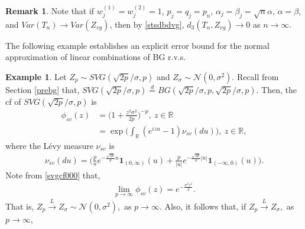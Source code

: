 \documentclass[12pt, a4paper,reqno]{amsart}
\theoremstyle{definition}
\newtheorem{exmp}[thm]{Example}
\theoremstyle{myremark}
\newtheorem{rem}[thm]{Remark}
\numberwithin{equation}{section}
\begin{document}
\begin{rem}
Note that if $w_j^{(1)}=w_j^{(2)}=1$, $p_j=q_j=p_n$, $\alpha_j=\beta_j=\sqrt{n} \alpha$, $\alpha=\beta$, and $Var(T_n) \to Var (Z_{vg})$, then by \eqref{stsdbdvg}, $d_3(T_n,Z_{vg}) \to 0$ as $n \to \infty$. 
\end{rem}
\vspace{-0.5cm}
\noindent
The following example establishes an explicit error bound for the normal approximation of linear combinations of BG r.v.s.
\vspace{-0.6cm}
\begin{exmp}
	Let $Z_p\sim SVG(\sqrt{2p}/\sigma, p)$ and $Z_\sigma \sim \mathcal{N}(0,\sigma^2) $. Recall from Section \ref{prebg} that,
$SVG(\sqrt{2p}/\sigma, p) \overset{d}{=}BG(\sqrt{2p}/\sigma, p,\sqrt{2p}/\sigma, p)$. Then, the cf of $SVG(\sqrt{2p}/\sigma, p)$ is
\begin{align}
\label{svgcf000}	\phi_{sv}(z)&= \bigg(1+ \frac{z^2 \sigma^2}{2p} \bigg)^{-p},~z\in\mathbb{R}\\
&=\exp\bigg(\displaystyle\int_{\mathbb{R}} (e^{izu}-1)\nu_{sv}(du)  \bigg),~z\in\mathbb{{R}},
\end{align}  
\noindent
where the L\'evy measure $\nu_{sv}$ is 
\begin{align*}
\nu_{sv}(du)=\bigg(\frac{p}{u}e^{- \frac{\sqrt{2p}}{\sigma} u}\textbf{1}_{(0,\infty)}(u)+ \frac{p}{|u|}e^{- \frac{\sqrt{2p}}{\sigma} |u|}\textbf{1}_{(-\infty,0)}(u) \bigg).
\end{align*}
\noindent
Note from \eqref{svgcf000} that, 
\begin{align*}
\lim_{p\to\infty}\phi_{sv}(z)=e^{-\frac{\sigma^2 z^2}{2}}.
\end{align*}
\noindent
That is, $Z_p \overset{L}{\to} Z_\sigma \sim \mathcal{N}(0,\sigma^2),$ as $p\to\infty.$ Also, it follows \cite[Theorem 7.12]{Villani} that, if $Z_p \overset{L}{\to} Z_\sigma,$ as $p \to \infty$,



\end{exmp}
\end{document}

